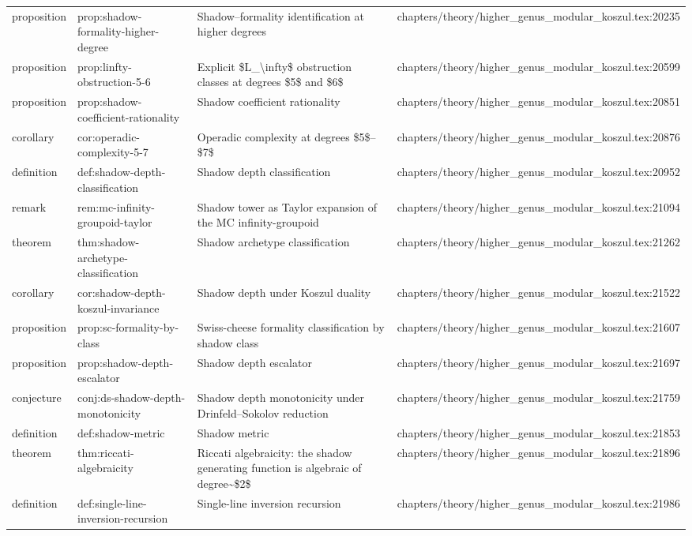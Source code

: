 \documentclass[11pt]{article}
\begin{document}
\begin{longtable}{L{0.10\textwidth}L{0.26\textwidth}L{0.42\textwidth}L{0.22\textwidth}}
proposition & prop:shadow-formality-higher-degree & Shadow--formality identification at higher degrees & chapters/theory/higher\_genus\_modular\_koszul.tex:20235\\
proposition & prop:linfty-obstruction-5-6 & Explicit \$L\_\textbackslash{}infty\$ obstruction classes at degrees \$5\$ and \$6\$ & chapters/theory/higher\_genus\_modular\_koszul.tex:20599\\
proposition & prop:shadow-coefficient-rationality & Shadow coefficient rationality & chapters/theory/higher\_genus\_modular\_koszul.tex:20851\\
corollary & cor:operadic-complexity-5-7 & Operadic complexity at degrees \$5\$--\$7\$ & chapters/theory/higher\_genus\_modular\_koszul.tex:20876\\
definition & def:shadow-depth-classification & Shadow depth classification & chapters/theory/higher\_genus\_modular\_koszul.tex:20952\\
remark & rem:mc-infinity-groupoid-taylor & Shadow tower as Taylor expansion of the MC infinity-groupoid & chapters/theory/higher\_genus\_modular\_koszul.tex:21094\\
theorem & thm:shadow-archetype-classification & Shadow archetype classification & chapters/theory/higher\_genus\_modular\_koszul.tex:21262\\
corollary & cor:shadow-depth-koszul-invariance & Shadow depth under Koszul duality & chapters/theory/higher\_genus\_modular\_koszul.tex:21522\\
proposition & prop:sc-formality-by-class & Swiss-cheese formality classification by shadow class & chapters/theory/higher\_genus\_modular\_koszul.tex:21607\\
proposition & prop:shadow-depth-escalator & Shadow depth escalator & chapters/theory/higher\_genus\_modular\_koszul.tex:21697\\
conjecture & conj:ds-shadow-depth-monotonicity & Shadow depth monotonicity under Drinfeld--Sokolov reduction & chapters/theory/higher\_genus\_modular\_koszul.tex:21759\\
definition & def:shadow-metric & Shadow metric & chapters/theory/higher\_genus\_modular\_koszul.tex:21853\\
theorem & thm:riccati-algebraicity & Riccati algebraicity: the shadow generating function is algebraic of degree\textasciitilde{}\$2\$ & chapters/theory/higher\_genus\_modular\_koszul.tex:21896\\
definition & def:single-line-inversion-recursion & Single-line inversion recursion & chapters/theory/higher\_genus\_modular\_koszul.tex:21986\\

\end{longtable}
\end{document}
